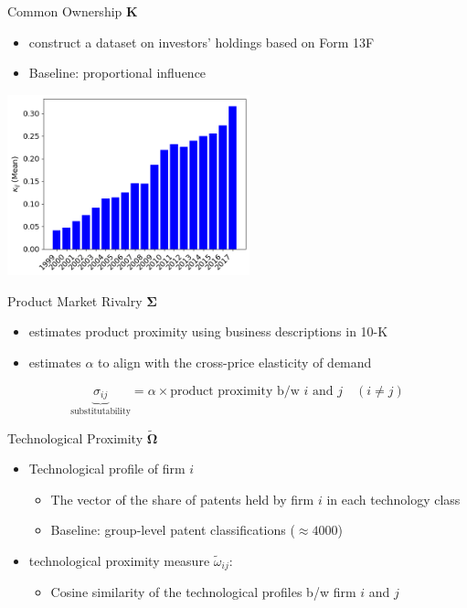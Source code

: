 \documentclass[
  10pt,               %
  aspectratio=169,    %
]{beamer}
\theoremstyle{plain}
\begin{document}
\begin{frame}{Common Ownership $\bm{K}$}
  \begin{itemize}
    \item \citet{Backus2021-yt} construct a dataset on investors' holdings based on Form 13F
    \item Baseline: \citet{Rotemberg1984-jz} proportional influence \hfill\hyperlink{rotemberg}{}
  \end{itemize}
  \begin{center}
    \includegraphics[width=7cm]{figures/kappa}
  \end{center}
\end{frame}
%
\begin{frame}{Product Market Rivalry $\bm{\Sigma}$} 

  \begin{itemize}
    \item \label{product_identification} \citet{Hoberg2016-jm} estimates product proximity using business
          descriptions in 10-K
          \medskip{}
    \item \citet{Pellegrino2024-dn} estimates $\alpha$ to align with the cross-price
          elasticity of demand \hyperlink{micro_vs_ghl}{}
  \end{itemize}
  \medskip{}
  \[
    \underbrace{\sigma_{ij}}_{\text{substitutability}}=\alpha\times\text{product proximity b/w }i\text{ and }j\quad\left(i\neq j\right)
  \]

\end{frame}
%
\begin{frame}{Technological Proximity $\widetilde{\bm{\Omega}}$}
  \begin{itemize}
    \item Technological profile of firm $i$
          \begin{itemize}
            \item The vector of the share of patents held by firm
            $i$ in each technology class
            \item Baseline: group-level patent classifications ($\approx4000$)\medskip{}
          \end{itemize}
          \medskip{}
    \item \citet{Jaffe1986-yz} technological proximity measure $\tilde{\omega}_{ij}$:
      \begin{itemize}
      \item Cosine similarity of the technological profiles b/w firm $i$ and $j$
      \end{itemize}
  \end{itemize}
\end{frame}
\end{document}

